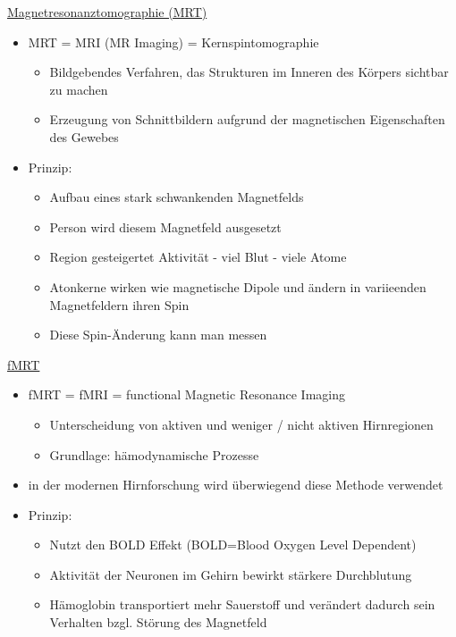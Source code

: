 \documentclass[a4paper,10pt,oneside]{article}
\begin{document}
\underline{Magnetresonanztomographie (MRT)} \\
	\begin{itemize}
		\item MRT = MRI (MR Imaging) = Kernspintomographie 
			\begin{itemize}
				\item Bildgebendes Verfahren, das Strukturen im Inneren des Körpers sichtbar zu machen
				\item Erzeugung von Schnittbildern aufgrund der magnetischen Eigenschaften des Gewebes 
			\end{itemize}
		\item Prinzip:
			\begin{itemize}
				\item Aufbau eines stark schwankenden Magnetfelds
				\item Person wird diesem Magnetfeld ausgesetzt
				\item Region gesteigertet Aktivität - viel Blut - viele Atome
				\item Atonkerne wirken wie magnetische Dipole und ändern in variieenden Magnetfeldern ihren Spin
				\item Diese Spin-Änderung kann man messen
			\end{itemize}
	\end{itemize}
	
\underline{fMRT} \\
	\begin{itemize}
		\item fMRT = fMRI = functional Magnetic Resonance Imaging
			\begin{itemize}
				\item Unterscheidung von aktiven und weniger / nicht aktiven Hirnregionen
				\item Grundlage: hämodynamische Prozesse
			\end{itemize}
		\item in der modernen Hirnforschung wird überwiegend diese Methode verwendet 
		\item Prinzip:
			\begin{itemize}
				\item Nutzt den BOLD Effekt (BOLD=Blood Oxygen Level Dependent)
				\item Aktivität der Neuronen im Gehirn bewirkt stärkere Durchblutung 
				\item Hämoglobin transportiert mehr Sauerstoff und verändert dadurch sein Verhalten bzgl. Störung des Magnetfeld
			\end{itemize}
	\end{itemize}
	
\end{document}
